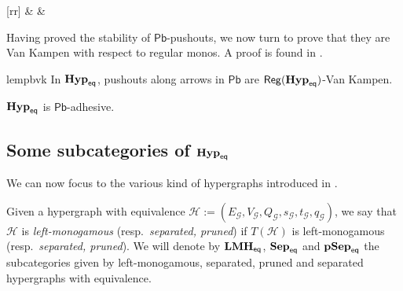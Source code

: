 \documentclass[3p]{elsarticle}
\newcommand{\pbc}{\mathsf{Pb}}
\newcommand{\catname}[1]{\textbf{\textup{#1}}}
\newcommand{\EqHyp}{\catname{Hyp}_{\mathsf{eq}}} %
\newcommand{\EqsHyp}{\catname{Sep}_{\mathsf{eq}}}
\newcommand{\EqpsHyp}{\catname{pSep}_{\mathsf{eq}}}
\newcommand{\Eqlmo}{\catname{LMH}_{\mathsf{eq}}}
\newcommand{\reg}{\mathsf{Reg}}
\theoremstyle{remark}
\theoremstyle{definition}
\begin{document}
\begin{exa}
\begin{minipage}[r]{.60\linewidth}
{
                \ar@{>->}[rr] & & 
                 }
  \end{minipage}
\end{exa}


Having proved the stability of $\pbc$-pushouts, we now turn to prove that they are Van Kampen with respect to regular monos.
%
A proof is found in .

\begin{restatable}{lem}{pbvk}\label{lemma:van_kampen}
	In $\EqHyp$, pushouts along arrows in $\pbc$ are $\reg(\EqHyp)$-Van Kampen.
\end{restatable}

\begin{cor}\label{cor:eqade}
	$\EqHyp$ is $\pbc$-adhesive.
\end{cor}

\subsection{Some subcategories of $\EqHyp$}
\label{labelledSubs}

We can now focus to the various kind of hypergraphs introduced in .

\begin{defi}Given a hypergraph with equivalence $\mathcal{H}:=(E_\mathcal{G}, V_{\mathcal{G}}, Q_\mathcal{G}, s_\mathcal{G}, t_\mathcal{G}, q_\mathcal{G})$, we say that $\mathcal{H}$ is \emph{left-monogamous} (resp.~\emph{separated, pruned}) if $T(\mathcal{H})$ is left-monogamous (resp.~\emph{separated, pruned}). We will denote by $\Eqlmo$, $\EqsHyp$ and $\EqpsHyp$ the  subcategories  given by left-monogamous, separated, pruned and separated hypergraphs with equivalence.
\end{defi}
\end{document}
